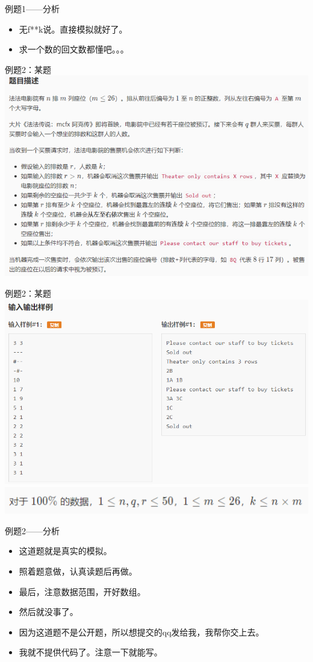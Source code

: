 \documentclass{beamer}[UTF-8]
\begin{document}
\begin{frame}{例题1——分析}
\pause
\begin{itemize}
\item 无f**k说。直接模拟就好了。  \pause
\item 求一个数的回文数都懂吧。。。
\end{itemize}
\end{frame}

\begin{frame}{例题2：某题}
\includegraphics{temp1.png}
\end{frame}

\begin{frame}{例题2：某题}
\includegraphics{temp2.png}
\includegraphics{temp3.png}
\end{frame}
\begin{frame}{例题2——分析}
 \pause
\begin{itemize}
\item 这道题就是真实的模拟。 \pause
\item 照着题意做，认真读题后再做。 \pause
\item 最后，注意数据范围，开好数组。 \pause
\item 然后就没事了。 \pause
\item 因为这道题不是公开题，所以想提交的qq发给我，我帮你交上去。
\item 我就不提供代码了。注意一下就能写。
\end{itemize}
\end{frame}
\end{document}

